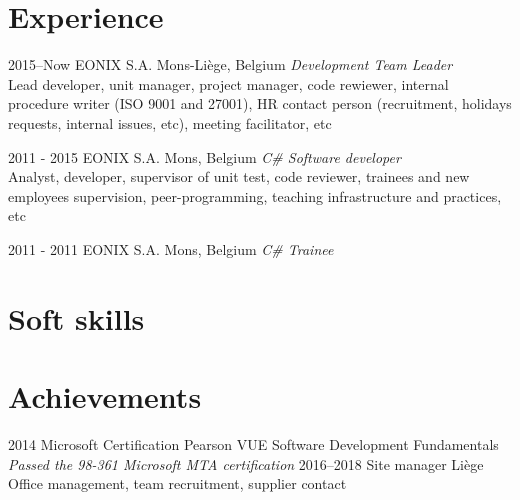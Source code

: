 \documentclass[a4paper]{cv-friggeri-x}
\begin{document}
\section{Experience}
%
%
\begin{entrylist}
\entry
{2015--Now}
{EONIX S.A.}
{Mons-Liège, Belgium}
{\emph{Development Team Leader}\\
Lead developer, unit manager, project manager, code rewiewer, internal procedure writer (ISO 9001 and 27001), HR contact person (recruitment, holidays requests, internal issues, etc), meeting facilitator, etc}
\end{entrylist}
%
\begin{entrylist}
\entry
{2011 - 2015}
{EONIX S.A.}
{Mons, Belgium}
{\emph{C\# Software developer}\\
Analyst, developer, supervisor of unit test, code reviewer, trainees and new employees supervision, peer-programming, teaching infrastructure and practices, etc}
\end{entrylist}
%
\begin{entrylist}
\entry
{2011 - 2011}
{EONIX S.A.}
{Mons, Belgium}
{\emph{C\# Trainee}}
\end{entrylist}
%
%
\section{ }
\section{Soft skills}
%
%
\section{ }
\section{Achievements}
%
\begin{entrylist}
%
\educationentry
{2014}
{Microsoft Certification}
{Pearson VUE}
{Software Development Fundamentals}
{\emph{Passed the 98-361 Microsoft MTA certification}}
%
\educationentry
{2016--2018}
{Site manager}
{Liège}
{Office management, team recruitment, supplier contact}
{\emph{ }}
\end{entrylist}
%
\end{document}
